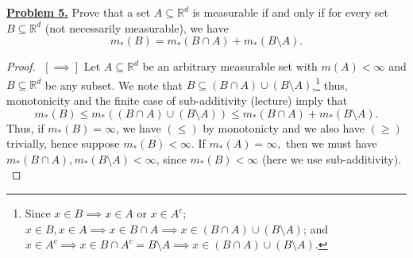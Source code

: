 
\noindent \underline{\textbf{Problem 5.}} Prove that a set \( A \subseteq \mathbb{R}^{d}  \) is measurable if and only if for every set \( B \subseteq \mathbb{R}^{d}  \) (not necessarily measurable), we have \[m_*(B) = m_*(B \cap A) + m_*(B \setminus A). \]
\begin{proof}$ $\newline
	\( [\implies ] \) Let \( A \subseteq \mathbb{R}^{d}  \) be an arbitrary measurable set with \( m(A) < \infty \) and \( B \subseteq \mathbb{R}^{d}  \) be any subset. We note that \( B \subseteq (B \cap A) \cup (B \setminus A) \),\footnote{Since \( x \in B \implies x \in A \) or \( x \in A^{c}  \); \( x \in B, x \in A \implies x \in B \cap A \implies x \in (B \cap A) \cup (B \setminus A) \); and \( x \in A^{c} \implies x \in B \cap A^{c} = B \setminus A \implies x \in (B \cap A) \cup (B \setminus A) \).} thus, monotonicity and the finite case of sub-additivity (lecture) imply that \[ m_*(B) \leq m_*((B \cap A) \cup (B \setminus A)) \leq m_*(B \cap A) + m_*(B \setminus A).    \] Thus, if \( m_*(B) = \infty \), we have \(( \leq )\) by monotonicty and we also have \( (\geq) \) trivially, hence suppose \( m_*(B) < \infty \). If \( m_*(A) = \infty, \) then we must have \( m_*(B \cap A) , m_*(B \setminus A) < \infty  \), since \( m_*(B) < \infty  \) (here we use sub-additivity). \\



\end{proof}
